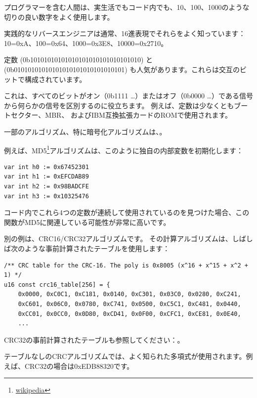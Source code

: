 
プログラマーを含む人間は、実生活でもコード内でも、10、100、1000のような切りの良い数字をよく使用します。

実践的なリバースエンジニアは通常、16進表現でそれらをよく知っています：
10=0xA、100=0x64、1000=0x3E8、10000=0x2710。

定数 (0b10101010101010101010101010101010) と \\
 (0b01010101010101010101010101010101) も人気があります。これらは交互のビットで構成されています。

これは、すべてのビットがオン（0b1111 \dots）またはオフ（0b0000 \dots）である信号から何らかの信号を区別するのに役立ちます。
例えば、定数は少なくともブートセクター、\ac{MBR}、
およびIBM互換拡張カードの\ac{ROM}で使用されます。

一部のアルゴリズム、特に暗号化アルゴリズムは、。

\newcommand{\URLMD}{http://go.yurichev.com/17111}

例えば、MD5\footnote{\href{\URLMD}{wikipedia}}アルゴリズムは、このように独自の内部変数を初期化します：

\begin{verbatim}
var int h0 := 0x67452301
var int h1 := 0xEFCDAB89
var int h2 := 0x98BADCFE
var int h3 := 0x10325476
\end{verbatim}

コード内でこれら4つの定数が連続して使用されているのを見つけた場合、この関数がMD5に関連している可能性が非常に高いです。

\par 別の例は、CRC16/CRC32アルゴリズムです。
その計算アルゴリズムは、しばしば次のような事前計算されたテーブルを使用します：

\begin{lstlisting}[caption=linux/lib/crc16.c,style=customc]
/** CRC table for the CRC-16. The poly is 0x8005 (x^16 + x^15 + x^2 + 1) */
u16 const crc16_table[256] = {
	0x0000, 0xC0C1, 0xC181, 0x0140, 0xC301, 0x03C0, 0x0280, 0xC241,
	0xC601, 0x06C0, 0x0780, 0xC741, 0x0500, 0xC5C1, 0xC481, 0x0440,
	0xCC01, 0x0CC0, 0x0D80, 0xCD41, 0x0F00, 0xCFC1, 0xCE81, 0x0E40,
	...
\end{lstlisting}

CRC32の事前計算されたテーブルも参照してください：。

テーブルなしのCRCアルゴリズムでは、よく知られた多項式が使用されます。例えば、CRC32の場合は0xEDB88320です。

